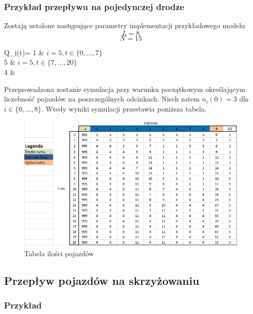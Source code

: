 \documentclass[12pt]{book}
\theoremstyle{plain}
\begin{document}
\subsubsection*{Przykład przepływu na pojedynczej drodze}
Zostają ustalone następujące parametry implementacji przykładowego modelu
	 \[L=8\]
	 \[N=15\]
	 
	 \begin{numcases}{Q_i(t)=}
	1 &  $i=5, t\in \{0,...,7\}$ \\ 
    5 &  $i=5, t\in \{7,...,20\}$ \\ 	
	4 & 
	\end{numcases}
Przeprowadzona zostanie symulacja przy warunku początkowym określającym liczebność pojazdów na poszczególnych odcinkach. Niech zatem $n_i(0)=3$ dla $i \in \{0,...,8\}$. Wtedy wyniki symulacji przestawia poniższa tabela.
\begin{figure}[H]
	\centering
	\includegraphics[width=14cm]{images/ctm_przyklad}
	\caption{Tabela ilości pojazdów}
	\label{fig:ctm_przyklad}\end{figure}

\subsection{Przepływ pojazdów na skrzyżowaniu}

\subsubsection{Przykład}
\end{document}
